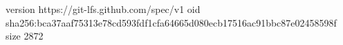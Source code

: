 version https://git-lfs.github.com/spec/v1
oid sha256:bca37aaf75313e78cd593fdf1cfa64665d080ecb17516ac91bbc87e02458598f
size 2872
